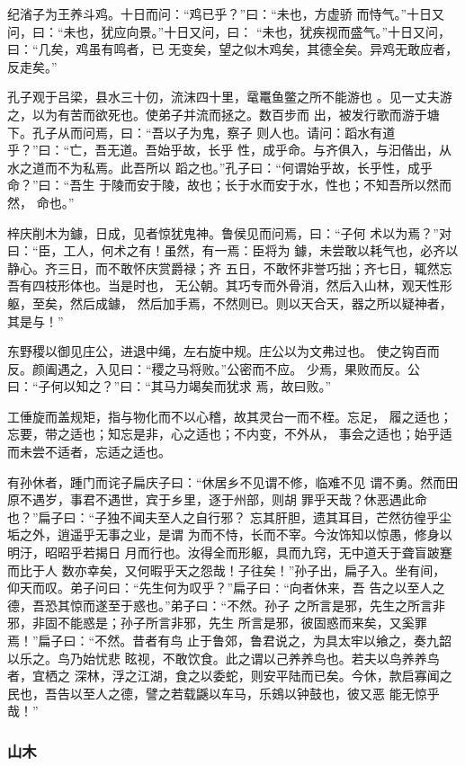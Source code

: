 \documentclass[]{article}
\begin{document}
纪渻子为王养斗鸡。十日而问：``鸡已乎？''曰：``未也，方虚骄
而恃气。''十日又问，曰：``未也，犹应向景。''十日又问，曰：
``未也，犹疾视而盛气。''十日又问，曰：``几矣，鸡虽有鸣者，已
无变矣，望之似木鸡矣，其德全矣。异鸡无敢应者，反走矣。''

孔子观于吕梁，县水三十仞，流沫四十里，鼋鼍鱼鳖之所不能游也
。见一丈夫游之，以为有苦而欲死也。使弟子并流而拯之。数百步而
出，被发行歌而游于塘下。孔子从而问焉，曰：``吾以子为鬼，察子
则人也。请问：蹈水有道乎？''曰：``亡，吾无道。吾始乎故，长乎
性，成乎命。与齐俱入，与汩偕出，从水之道而不为私焉。此吾所以
蹈之也。''孔子曰：``何谓始乎故，长乎性，成乎命？''曰：``吾生
于陵而安于陵，故也；长于水而安于水，性也；不知吾所以然而然， 命也。''

梓庆削木为鐻，日成，见者惊犹鬼神。鲁侯见而问焉，曰：``子何
术以为焉？''对曰：``臣，工人，何术之有！虽然，有一焉：臣将为
鐻，未尝敢以耗气也，必齐以静心。齐三日，而不敢怀庆赏爵禄；齐
五日，不敢怀非誉巧拙；齐七日，辄然忘吾有四枝形体也。当是时也，
无公朝。其巧专而外骨消，然后入山林，观天性形躯，至矣，然后成鐻，
然后加手焉，不然则已。则以天合天，器之所以疑神者，其是与！''

东野稷以御见庄公，进退中绳，左右旋中规。庄公以为文弗过也。
使之钩百而反。颜阖遇之，入见曰：``稷之马将败。''公密而不应。
少焉，果败而反。公曰：``子何以知之？''曰：``其马力竭矣而犹求
焉，故曰败。''

工倕旋而盖规矩，指与物化而不以心稽，故其灵台一而不桎。忘足，
履之适也；忘要，带之适也；知忘是非，心之适也；不内变，不外从，
事会之适也；始乎适而未尝不适者，忘适之适也。

有孙休者，踵门而诧子扁庆子曰：``休居乡不见谓不修，临难不见
谓不勇。然而田原不遇岁，事君不遇世，宾于乡里，逐于州部，则胡
罪乎天哉？休恶遇此命也？''扁子曰：``子独不闻夫至人之自行邪？
忘其肝胆，遗其耳目，芒然彷徨乎尘垢之外，逍遥乎无事之业，是谓
为而不恃，长而不宰。今汝饰知以惊愚，修身以明汙，昭昭乎若揭日
月而行也。汝得全而形躯，具而九窍，无中道夭于聋盲跛蹇而比于人
数亦幸矣，又何暇乎天之怨哉！子往矣！''孙子出，扁子入。坐有间，
仰天而叹。弟子问曰：``先生何为叹乎？''扁子曰∶``向者休来，吾
告之以至人之德，吾恐其惊而遂至于惑也。''弟子曰：``不然。孙子
之所言是邪，先生之所言非邪，非固不能惑是；孙子所言非邪，先生
所言是邪，彼固惑而来矣，又奚罪焉！''扁子曰：``不然。昔者有鸟
止于鲁郊，鲁君说之，为具太牢以飨之，奏九韶以乐之。鸟乃始忧悲
眩视，不敢饮食。此之谓以己养养鸟也。若夫以鸟养养鸟者，宜栖之
深林，浮之江湖，食之以委蛇，则安平陆而已矣。今休，款启寡闻之
民也，吾告以至人之德，譬之若载鼷以车马，乐鴳以钟鼓也，彼又恶
能无惊乎哉！''

\hypertarget{header-n2240}{%
\subsubsection{山木}\label{header-n2240}}
\end{document}
